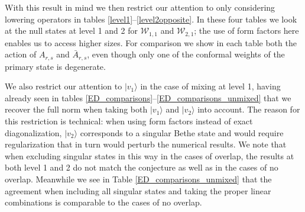 \documentclass[a4paper,10pt]{article}
\newcommand{\linnea}[1]{$\framebox{\tiny L}$\ \textbf{\texttt{{\color{red}\footnotesize#1}}}}
\newcommand{\aSt}{\mathcal{W}}
\newcommand{\AStTL}[2]{\aSt_{#1,#2}}
\begin{document}
\FloatBarrier

With this result in mind we then restrict our attention to only considering lowering operators in tables \ref{level1}--\ref{level2opposite}. In these four tables we look at the null states at level 1 and 2 for $\AStTL{1}{1}$ and $\AStTL{2}{1}$; the use of form factors here enables us to access higher sizes.
For comparison we show in each table both the action of $A_{r,s}$ and $\bar{A}_{r,s}$, even though only one of the conformal weights of the primary state is degenerate. 
 
We also restrict our attention to $|v_1\rangle$ in the case of mixing at level 1, having already seen in tables \ref{ED_comparisons}--\ref{ED_comparisons_unmixed} that we recover the full norm when taking both $|v_1\rangle$ and $|v_2\rangle$ into account. The reason for this restriction is technical: when using form factors instead of exact diagonalization, $|v_2\rangle$ corresponds to a singular Bethe state and would require regularization that in turn would perturb the numerical results. 
We note that when excluding singular states in this way in the cases of overlap, the results at both level 1 and 2 do not match the conjecture as well as in the cases of no overlap. Meanwhile we see in Table \ref{ED_comparisons_unmixed} that the agreement when including all singular states and taking the proper linear combinations is comparable to the cases of no overlap. 

 

 
\end{document}
